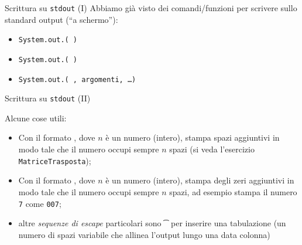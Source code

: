 
\begin{frame}{Scrittura su \texttt{stdout} (I)}
  Abbiamo già visto dei comandi/funzioni per scrivere sullo standard output (``a schermo''):
  \begin{itemize}
   \item \texttt{System.out.(  )}
   \item \texttt{System.out.(  )}
   \item \texttt{System.out.( , argomenti, \dots)}
  \end{itemize}
 
\end{frame}

\begin{frame}{Scrittura su \texttt{stdout} (II)}

Alcune cose utili:
  \begin{itemize}
   \item Con  il formato , dove $n$ è un numero (intero),
   stampa spazi aggiuntivi in modo tale che il numero occupi sempre $n$ spazi (si veda 
   l'esercizio \texttt{MatriceTrasposta});
   \item Con  il formato , dove $n$ è un numero (intero),
   stampa degli zeri aggiuntivi in modo tale che il numero occupi sempre $n$ spazi, ad
   esempio  stampa il numero \texttt{7} come \texttt{007};
   \item altre \emph{sequenze di escape} particolari sono \texttt{\string\t} per inserire una
   tabulazione (un numero di spazi variabile che allinea l'output lungo una data colonna)
  \end{itemize}
\end{frame}
